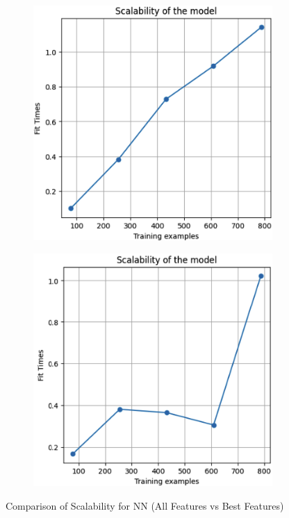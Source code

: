 \documentclass[conference]{IEEEtran}
\begin{document}
\begin{figure}[H]
    \centering
    \begin{subfigure}[b]{0.45\linewidth}
        \centering
        \includegraphics[width=\linewidth]{images/ScalabilityNNAllFeatures.png}
        \label{fig:scalability-all}
    \end{subfigure}
    \hfill
    \begin{subfigure}[b]{0.45\linewidth}
        \centering
        \includegraphics[width=\linewidth]{images/ScalabilityNNBestFeatures.png}
        \label{fig:scalability-best}
    \end{subfigure}
    \caption{Comparison of Scalability for NN (All Features vs Best Features)}
    \label{fig:scalability-comparison}
\end{figure}
\end{document}

